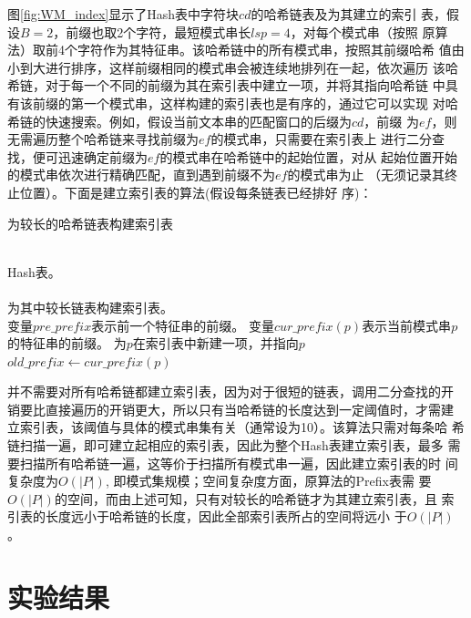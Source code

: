 图\ref{fig:WM_index}显示了Hash表中字符块$cd$的哈希链表及为其建立的索引
表，假设$B=2$，前缀也取2个字符，最短模式串长$lsp=4$，对每个模式串（按照
原算法）取前4个字符作为其特征串。该哈希链中的所有模式串，按照其前缀哈希
值由小到大进行排序，这样前缀相同的模式串会被连续地排列在一起，依次遍历
该哈希链，对于每一个不同的前缀为其在索引表中建立一项，并将其指向哈希链
中具有该前缀的第一个模式串，这样构建的索引表也是有序的，通过它可以实现
对哈希链的快速搜索。例如，假设当前文本串的匹配窗口的后缀为$cd$，前缀
为$ef$，则无需遍历整个哈希链来寻找前缀为$ef$的模式串，只需要在索引表上
进行二分查找，便可迅速确定前缀为$ef$的模式串在哈希链中的起始位置，对从
起始位置开始的模式串依次进行精确匹配，直到遇到前缀不为$ef$的模式串为止
（无须记录其终止位置）。下面是建立索引表的算法(假设每条链表已经排好
序)：

\begin{algorithm}
  \caption{为较长的哈希链表构建索引表}
  \label{alg:build_index}
  \begin{algorithmic}[1]
    \REQUIRE ~~\\
    Hash表。 \\
    \ENSURE ~~\\
    为其中较长链表构建索引表。\\
    \STATE
    \STATE 变量$pre\_prefix$表示前一个特征串的前缀。
    \STATE 变量$cur\_prefix(p)$表示当前模式串$p$的特征串的前缀。
    \STATE 
    \STATE 为$p$在索引表中新建一项，并指向$p$
    \STATE $old\_prefix \leftarrow cur\_prefix(p)$
    \ENDIF
    \ENDFOR
    \ENDIF
    \ENDFOR
  \end{algorithmic}
\end{algorithm}

并不需要对所有哈希链都建立索引表，因为对于很短的链表，调用二分查找的开
销要比直接遍历的开销更大，所以只有当哈希链的长度达到一定阈值时，才需建
立索引表，该阈值与具体的模式串集有关（通常设为10）。该算法只需对每条哈
希链扫描一遍，即可建立起相应的索引表，因此为整个Hash表建立索引表，最多
需要扫描所有哈希链一遍，这等价于扫描所有模式串一遍，因此建立索引表的时
间复杂度为$O(|P|)$, 即模式集规模；空间复杂度方面，原算法的Prefix表需
要$O(|P|)$的空间，而由上述可知，只有对较长的哈希链才为其建立索引表，且
索引表的长度远小于哈希链的长度，因此全部索引表所占的空间将远小
于$O(|P|)$。


\section{实验结果}
\label{sec:5_experiment}

